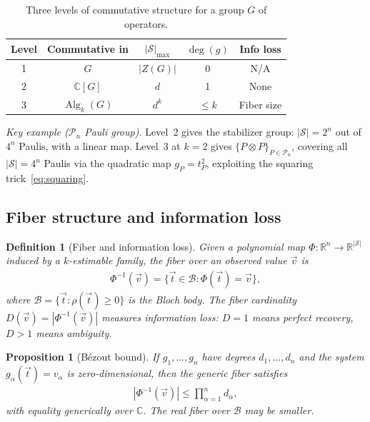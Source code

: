 \documentclass[aps,%
twocolumn,%
floatfix,%
pra,%
amsfonts,%
groupedaddress,%
superscriptaddress]{revtex4-2}%
\newtheorem{proposition}[theorem]{Proposition}
\newtheorem{definition}{Definition}[section]
\newcommand{\ox}{\otimes}
\newcommand{\1}{\mathbbm{1}}
\newcommand*{\cP}{\mathcal{P}}
\newcommand*{\cS}{\mathcal{S}}
\newcommand*{\cB}{\mathcal{B}}
\DeclareMathOperator{\Alg}{Alg}
\begin{document}
\begin{table}[h]
\centering
\begin{tabular}{c|c|c|c|c}
\textbf{Level} & \textbf{Commutative in} & $|\cS|_{\max}$ & $\deg(g)$ & \textbf{Info loss} \\ \hline
1 & $G$ & $|Z(G)|$ & 0 & N/A \\
2 & $\mathbb{C}[G]$ & $d$ & 1 & None \\
3 & $\Alg_k(G)$ & $d^k$ & $\leq k$ & Fiber size
\end{tabular}
\caption{Three levels of commutative structure for a group $G$ of operators.}
\label{tab:three_levels}
\end{table}

\emph{Key example ($\cP_n$ Pauli group).}
Level~2 gives the stabilizer group: $|\cS| = 2^n$ out of $4^n$ Paulis, with a linear map.
Level~3 at $k=2$ gives $\{P\ox P\}_{P\in\cP_n}$, covering all $|\cS| = 4^n$ Paulis via the quadratic map $g_P = t_P^2$, exploiting the squaring trick~\eqref{eq:squaring}.


\subsection{Fiber structure and information loss}\label{app:fiber}

\begin{definition}[Fiber and information loss]\label{def:fiber}
Given a polynomial map $\Phi: \mathbb{R}^n \to \mathbb{R}^{|\cS|}$ induced by a $k$-estimable family, the \emph{fiber} over an observed value $\vec{v}$ is
\begin{align}
\Phi^{-1}(\vec{v}) = \{\vec{t} \in \cB : \Phi(\vec{t}) = \vec{v}\},
\end{align}
where $\cB = \{\vec{t} : \rho(\vec{t}) \geq 0\}$ is the Bloch body. The \emph{fiber cardinality} $D(\vec{v}) = |\Phi^{-1}(\vec{v})|$ measures information loss: $D = 1$ means perfect recovery, $D > 1$ means ambiguity.
\end{definition}

\begin{proposition}[B\'ezout bound]\label{prop:bezout}
If $g_1,\ldots,g_n$ have degrees $d_1,\ldots,d_n$ and the system $g_\alpha(\vec{t}) = v_\alpha$ is zero-dimensional, then the generic fiber satisfies
\begin{align}\label{eq:bezout}
|\Phi^{-1}(\vec{v})| \leq \prod_{\alpha=1}^n d_\alpha,
\end{align}
with equality generically over $\mathbb{C}$. The real fiber over $\cB$ may be smaller.
\end{proposition}
\end{document}
